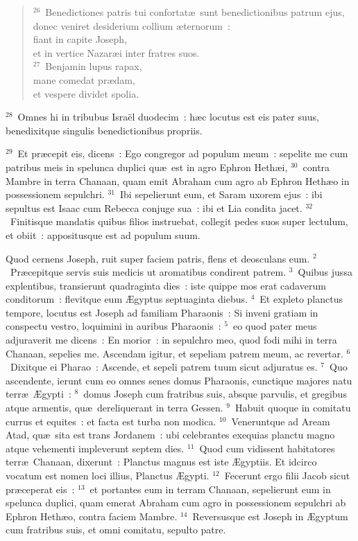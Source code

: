 \begin{flushleft}
\begin{verse}
${}^{26}$~Benedictiones patris tui confortat\ae\ sunt benedictionibus patrum ejus,\\ donec veniret desiderium collium \ae ternorum~:\\ fiant in capite Joseph,\\ et in vertice Nazar\ae i inter fratres suos.\\
${}^{27}$~Benjamin lupus rapax,\\ mane comedat pr\ae dam,\\ et vespere dividet spolia.\end{verse}\end{flushleft}


${}^{28}$~Omnes hi in tribubus Isra\"el duodecim~: h\ae c locutus est eis pater suus, benedixitque singulis benedictionibus propriis.


${}^{29}$~Et pr\ae cepit eis, dicens~: Ego congregor ad populum meum~: sepelite me cum patribus meis in spelunca duplici qu\ae\ est in agro Ephron Heth\ae i,
${}^{30}$~contra Mambre in terra Chanaan, quam emit Abraham cum agro ab Ephron Heth\ae o in possessionem sepulchri.
${}^{31}$~Ibi sepelierunt eum, et Saram uxorem ejus~: ibi sepultus est Isaac cum Rebecca conjuge sua~: ibi et Lia condita jacet.
${}^{32}$~Finitisque mandatis quibus filios instruebat, collegit pedes suos super lectulum, et obiit~: appositusque est ad populum suum.

\lettrine[lines=3,image=true,loversize=0.05,lraise=-0.03]{Q}{}uod cernens Joseph, ruit super faciem patris, flens et deosculans eum.
${}^{2}$~Pr\ae cepitque servis suis medicis ut aromatibus condirent patrem.
${}^{3}$~Quibus jussa explentibus, transierunt quadraginta dies~: iste quippe mos erat cadaverum conditorum~: flevitque eum \AE gyptus septuaginta diebus.
${}^{4}$~Et expleto planctus tempore, locutus est Joseph ad familiam Pharaonis~: Si inveni gratiam in conspectu vestro, loquimini in auribus Pharaonis~:
${}^{5}$~eo quod pater meus adjuraverit me dicens~: En morior~: in sepulchro meo, quod fodi mihi in terra Chanaan, sepelies me. Ascendam igitur, et sepeliam patrem meum, ac revertar.
${}^{6}$~Dixitque ei Pharao~: Ascende, et sepeli patrem tuum sicut adjuratus es.
${}^{7}$~Quo ascendente, ierunt cum eo omnes senes domus Pharaonis, cunctique majores natu terr\ae\ \AE gypti~:
${}^{8}$~domus Joseph cum fratribus suis, absque parvulis, et gregibus atque armentis, qu\ae\ dereliquerant in terra Gessen.
${}^{9}$~Habuit quoque in comitatu currus et equites~: et facta est turba non modica.
${}^{10}$~Veneruntque ad Aream Atad, qu\ae\ sita est trans Jordanem~: ubi celebrantes exequias planctu magno atque vehementi impleverunt septem dies.
${}^{11}$~Quod cum vidissent habitatores terr\ae\ Chanaan, dixerunt~: Planctus magnus est iste \AE gyptiis. Et idcirco vocatum est nomen loci illius, Planctus \AE gypti.
${}^{12}$~Fecerunt ergo filii Jacob sicut pr\ae ceperat eis~:
${}^{13}$~et portantes eum in terram Chanaan, sepelierunt eum in spelunca duplici, quam emerat Abraham cum agro in possessionem sepulchri ab Ephron Heth\ae o, contra faciem Mambre.
${}^{14}$~Reversusque est Joseph in \AE gyptum cum fratribus suis, et omni comitatu, sepulto patre.


